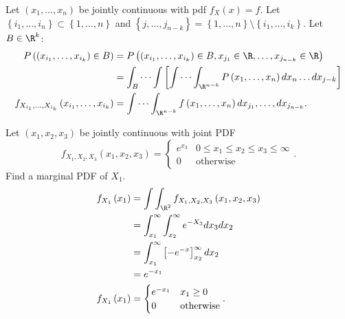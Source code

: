 \begin{definition}
	Let $\left( x_1, \ldots , x_{n} \right) $ be jointly continuous with pdf $f_X \left( x \right) = f$. Let $\left\{ i_1, \ldots, i_{n} \right\} \subset \left\{ 1, \ldots, n \right\} $ and $\left\{ j, \ldots, j_{n - k} \right\}  = \left\{ 1, \ldots , n \right\} \setminus \left\{ i_{1}, \ldots, i_{k}\right\}$. Let $B \in  \R^{k}$: 
	\begin{align*}
		P\left( \left( x_{i_{1}}, \ldots,  x_{i_{k}}\right) \in B \right)  
		&= P \left( \left( x_{i_{1}}, \ldots, x_{i_{k}}  \right) \in B, x _{j_{1}} \in  \R, \ldots, x_{j_{n-k}} \in  \R \right)  \\
		&= \int_{B} \cdots \int \left[ \int \cdots \int_{\R^{n - k}} P \left( x_1, \ldots, x_{n} \right) dx_{n} \ldots dx_{j - k} \right] \\
		f_{X_{i_{1}}, \ldots, X_{i_{k}}} \left( x_{i_{1}}, \ldots, x_{i_{k}} \right) 
		&= \int \cdots \int_{\R ^{n - k}} f\left( x_{1}, \ldots, x_{n} \right)  dx_{j_{1}}, \ldots, dx_{j_{n-k}}
	.\end{align*}
\end{definition}

\begin{example}
	Let $\left( x_1, x_2, x_3 \right) $ be jointly continuous with joint PDF 
	\[
		f_{X_1, X_2, X_3} \left( x_1, x_2, x_3 \right) =
		\begin{cases}
			e^{x_3} & 0 \le x_1\le x_2\le  x_3\le  \infty \\
			0 & \text{otherwise}
		\end{cases}		
	.\]  
	Find a marginal PDF of $X_1$. 
	\begin{align*}
		f_{X_1} \left( x_1 \right)  &= \int \int_{\R^2} f_{X_1, X_2, X_3} \left( x_1, x_2, x_3 \right) \\
		&= \int_{x_1}^{\infty} \int_{x_2}^{\infty}  e^{-X_3}dx_3 dx_2 \\
		&= \int_{x_1}^{\infty} \left[ -e^{-x} \right] _{x_2}^{\infty} dx_2 \\
		&= e^{-x_1} \\
		f_{X_1}\left( x_1 \right)  &=
		\begin{cases}
			e^{-x_1} & x_1 \ge   0 \\
			0 & \text{otherwise}
		\end{cases}
	.\end{align*}
\end{example}
